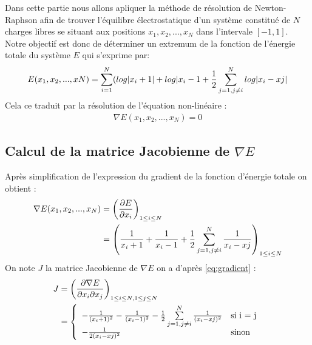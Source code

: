 Dans cette partie nous allons apliquer la méthode de résolution de Newton-Raphson afin de trouver l'équilibre électrostatique d'un système constitué de $N$ charges libres se situant aux positions $x_{1},x_{2},...,x_{N}$ dans l'intervale $[-1,1]$. Notre objectif est donc de déterminer un extremum de la fonction de l'énergie totale du système $E$ qui s'exprime par:
\begin{equation}
  E(x_{1},x_{2},...,x{N}) =  \sum\limits^{N}_{i=1}(log|x_{i}+1| + log|x_{i} -1 + \frac{1}{2}\sum\limits^{N}_{j=1,j \neq i} log|x_{i} - x{j}| 
\end{equation}
Cela ce traduit par la résolution de l'équation non-linéaire :
\begin{equation}
  \label{eq:eq1}
  \begin{split}
  \nabla E(x_{1},x_{2},...,x_{N}) = 0
  \end{split}
\end{equation}

\subsection{Calcul de la matrice Jacobienne de $\nabla E$}
Après simplification de l'expression du gradient de la fonction d'énergie totale on obtient : 
\begin{equation}
  \label{eq:gradient}
  \begin{split}
    \nabla E(x_{1},x_{2},...,x_{N})  & = \left( \frac{\partial E }{\partial x_{i}}\right)_{1 \leq i \leq N} \\
    & = \left(\frac{1}{x_{i}+1} + \frac{1}{x_{i} -1} + \frac{1}{2} \sum\limits^{N}_{j=1,j\neq i}\frac{1}{x_{i}-x{j}}\right)_{1 \leq i \leq N }
  \end{split}
\end{equation}
On note $J$ la matrice Jacobienne de $\nabla E$
on a d'après \ref{eq:gradient} :
\begin{equation}
  \label{eq:jacobian}
  \begin{split}
    J & = \left(\frac{\partial \nabla E }{\partial x_{i} \partial x_{j}}\right)_{1 \leq i \leq N , 1 \leq j \leq N} \\
    & = \left\{
    \begin{array}{ll}
      -\frac{1}{(x_{i}+1)^{2}} - \frac{1}{(x_{i} -1)^{2}} - \frac{1}{2} \sum\limits^{N}_{j=1,j\neq i}\frac{1}{(x_{i}-x{j})^{2}}& \mbox{si i = j} \\
      -\frac{1}{2(x_{i} - x{j})^{2}} & \mbox{sinon} 
    \end{array}
    \right.
  \end{split}  
\end{equation}

